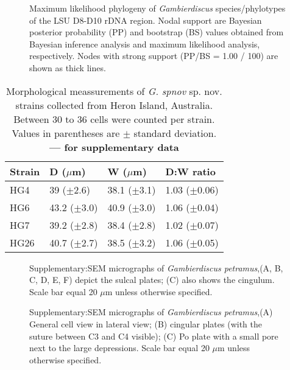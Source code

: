 \documentclass[12pt]{article}
\begin{document}
\begin{figure} 
\caption{Maximum likelihood phylogeny of \textit{Gambierdiscus} species/phylotypes of the LSU D8-D10 rDNA region. Nodal support are Bayesian posterior probability (PP) and bootstrap (BS) values obtained from Bayesian inference analysis and maximum likelihood analysis, respectively. Nodes with strong support (PP/BS = 1.00 / 100) are shown as thick lines.} 
\label{fig:HGD8D10}
\end{figure} 


\FloatBarrier
\begin{table}
\caption{Morphological meassurements of \emph{G. spnov }sp. nov. strains collected from Heron Island, Australia. Between 30 to 36 cells were counted per strain. Values in parentheses are $\pm$ standard deviation. \textbf{--- for supplementary data}}
\label{tbl:SizeTable}
\begin{tabular}{ | p{2cm} | p{2.5cm} | p{2.5cm} | p{2.5cm} | }
\hline
 \textbf{Strain} & \textbf{D ($\mu$m)} & \textbf{W ($\mu$m)}  & \textbf{D:W ratio}  \\
 \hline
 HG4  & 39 ($\pm$2.6) & 38.1 ($\pm$3.1) & 1.03 ($\pm$0.06) \\

 HG6  & 43.2 ($\pm$3.0) & 40.9 ($\pm$3.0) & 1.06 ($\pm$0.04)  \\

 HG7  & 39.2 ($\pm$2.8) & 38.4 ($\pm$2.8) & 1.02 ($\pm$0.07)  \\

 HG26  & 40.7 ($\pm$2.7) & 38.5 ($\pm$3.2) & 1.06 ($\pm$0.05) \\
 \hline
\end{tabular}
\end{table}
\FloatBarrier

\FloatBarrier 
\begin{figure} 
\caption{Supplementary:SEM micrographs of \emph{Gambierdiscus petramus},(A, B, C, D, E, F) depict the sulcal plates; (C) also shows the cingulum. Scale bar equal 20 $\mu$m unless otherwise specified.} 
\label{fig:sulcSEM}
\end{figure} 
\FloatBarrier

\FloatBarrier 
\begin{figure} 
\caption{Supplementary:SEM micrographs of \emph{Gambierdiscus petramus},(A) General cell view in lateral view; (B) cingular plates (with the suture between C3
and C4 visible); (C) Po plate with a small pore next to the large depressions. Scale bar equal 20 $\mu$m unless otherwise specified.} 
\label{fig:latSEM}
\end{figure} 
\FloatBarrier
\end{document}
